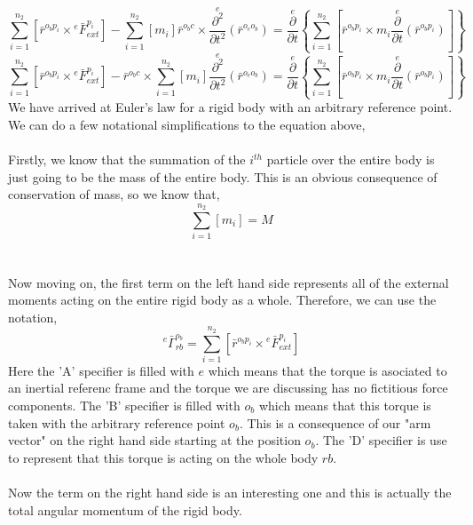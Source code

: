 $$\sum^{n_{2}}_{i = 1}\left[\bar{r}^{o_{b}p_{i}}\times{}^{e}\bar{F}^{p_{i}}_{ext}\right]
- \sum^{n_{2}}_{i = 1}\left[m_{i}\right]\bar{r}^{o_{b}c}\times \overset{e}{\frac{\partial^{2}}{\partial t^{2}}}(\bar{r}^{o_{e}o_{b}})
= \overset{e}{\frac{\partial}{\partial t}}\left\{\sum^{n_{2}}_{i = 1}\left[ \bar{r}^{o_{b}p_{i}}\times m_{i}\overset{e}{\frac{\partial}{\partial t}}\left(\bar{r}^{o_{b}p_{i}}\right)\right]\right\}$$
\begin{equation}
\sum^{n_{2}}_{i = 1}\left[\bar{r}^{o_{b}p_{i}}\times{}^{e}\bar{F}^{p_{i}}_{ext}\right]
- \bar{r}^{o_{b}c}\times\sum^{n_{2}}_{i = 1}\left[m_{i}\right]\overset{e}{\frac{\partial^{2}}{\partial t^{2}}}(\bar{r}^{o_{e}o_{b}})
= \overset{e}{\frac{\partial}{\partial t}}\left\{\sum^{n_{2}}_{i = 1}\left[ \bar{r}^{o_{b}p_{i}}\times m_{i}\overset{e}{\frac{\partial}{\partial t}}\left(\bar{r}^{o_{b}p_{i}}\right)\right]\right\}
\label{Eulers Law Rigid Body Non-Inertial Arbitrary Reference Point Unrefined}
\end{equation}
We have arrived at Euler's law for a rigid body with an arbitrary reference point.
We can do a few notational simplifications to the equation above,
\\~\\Firstly, we know that the summation of the $i^{th}$ particle over the entire body is just going to be the mass of the entire body.
This is an obvious consequence of conservation of mass, so we know that,
$$\sum^{n_{2}}_{i = 1}\left[m_{i}\right] = M$$
\\~\\Now moving on, the first term on the left hand side represents all of the external moments acting on the entire rigid body as a whole.
Therefore, we can use the notation,
$${}^{e}\bar{\Gamma}^{o_{b}}_{rb} = \sum^{n_{2}}_{i = 1}\left[\bar{r}^{o_{b}p_{i}}\times{}^{e}\bar{F}^{p_{i}}_{ext}\right]$$
Here the 'A' specifier is filled with $e$ which means that the torque is asociated to an inertial referenc frame and the torque we are discussing has no fictitious force components.
The 'B' specifier is filled with $o_{b}$ which means that this torque is taken with the arbitrary reference point $o_{b}$. 
This is a consequence of our "arm vector" on the right hand side starting at the position $o_{b}$.
The 'D' specifier is use to represent that this torque is acting on the whole body $rb$.
\\~\\Now the term on the right hand side is an interesting one and this is actually the total angular momentum of the rigid body.
